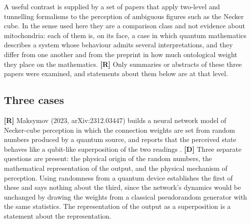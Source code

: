 \documentclass[11pt]{article}
\newcommand{\stR}{\textbf{\textcolor{blue!55!black}{[R]}}}
\newcommand{\stD}{\textbf{\textcolor{green!40!black}{[D]}}}
\theoremstyle{plain}
\theoremstyle{definition}
\theoremstyle{remark}
\begin{document}
A useful contrast is supplied by a set of papers that apply two-level and tunnelling formalisms to the perception of ambiguous figures such as the Necker cube. In the sense used here they are a comparison class and not evidence about mitochondria: each of them is, on its face, a case in which quantum mathematics describes a system whose behaviour admits several interpretations, and they differ from one another and from the preprint in how much ontological weight they place on the mathematics. \stR{} Only summaries or abstracts of these three papers were examined, and statements about them below are at that level.

\subsection{Three cases}

\stR{} Maksymov (2023, arXiv:2312.03447) builds a neural network model of Necker-cube perception in which the connection weights are set from random numbers produced by a quantum source, and reports that the perceived state behaves like a qubit-like superposition of the two readings \cite{maksymov2023}. \stD{} Three separate questions are present: the physical origin of the random numbers, the mathematical representation of the output, and the physical mechanism of perception. Using randomness from a quantum device establishes the first of these and says nothing about the third, since the network's dynamics would be unchanged by drawing the weights from a classical pseudorandom generator with the same statistics. The representation of the output as a superposition is a statement about the representation.
\end{document}
